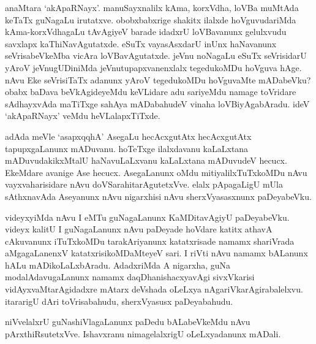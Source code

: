 anaMtara `akApaRNayx'. manuSayxnalilx kAma, korxVdha, loVBa muMtAda keTaTx guNagaLu irutatxve. obobxbabxrige shakitx ilalxde hoVguvudariMda 
kAma-korxVdhagaLu tAvAgiyeV barade idadxrU loVBavanunx gelulxvudu savxlapx kaThiNavAgutatxde. eSuTx vayasAsxdarU inUnx haNavanunx 
seVrisabeVkeMba vicAra loVBavAgutatxde. jeVnu noNagaLu eSuTx seVrisidarU yAroV jeVnugUDiniMda jeVnutupapxvanenxlalx 
tegedukoMDu hoVguva hAge. nAvu Eke seVrisiTaTx adanunx yAroV tegedukoMDu hoVguvaMte mADabeVku? obabx baDava 
beVkAgideyeMdu keVLidare adu sariyeMdu namage toVridare sAdhayxvAda maTiTxge sahAya mADabahudeV vinaha loVBiyAgabAradu. ideV `akApaRNayx' veMdu heVLalapxTiTxde.

adAda meVle `asapxqqhA' AsegaLu hecAcxgutAtx hecAcxgutAtx tapupxgaLanunx mADuvanu. hoTeTxge ilalxdavanu kaLaLxtana mADuvudakikxMtalU 
haNavuLaLxvanu kaLaLxtana mADuvudeV hecucx. EkeMdare avanige Ase hecucx. AsegaLanunx oMdu mitiyalilxTuTxkoMDu nAvu vayxvaharisidare nAvu 
doVSarahitarAgutetxVve. elalx pApagaLigU mUla sAthxnavAda Aseyanunx nAvu nigarxhisi nAvu sherxVyasasxnunx paDeyabeVku.

videyxyiMda nAvu I eMTu guNagaLanunx KaMDitavAgiyU paDeyabeVku. videyx kalitU I guNagaLanunx nAvu paDeyade hoVdare katitx athavA 
cAkuvanunx iTuTxkoMDu tarakAriyanunx katatxrisade namamx shariVrada aMgagaLanenxV katatxrisikoMDaMteyeV sari. I riVti nAvu namamx bALanunx 
hALu mADikoLaLxbAradu. AdadxriMda A nigarxha, guNa modalAdavugaLanunx namamx daqDhanishacxyavAgi sivxVkarisi vidAyxvaMtarAgidadxre mAtarx 
deVshada oLeLxya nAgariVkarAgirabalelxvu. itararigU dAri toVrisabahudu, sherxVyasusx paDeyabahudu.

niVvelalxrU guNashiVlagaLanunx paDedu bALabeVkeMdu nAvu pArxthiRsutetxVve. Ishavxranu nimagelalxrigU oLeLxyadanunx mADali. 

 

